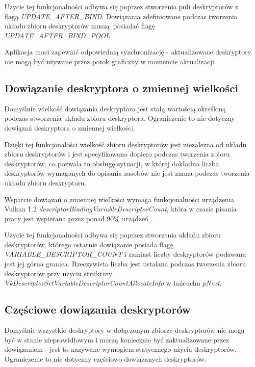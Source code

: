 Użycie tej funkcjonalności odbywa się poprzez stworzenia puli deskryptorów z flagą \textit{UPDATE\_AFTER\_BIND}. Dowiązania zdefiniowane podczas tworzenia układu zbioru deskryptorów muszą posiadać flagę
\textit{UPDATE\_AFTER\_BIND\_POOL}.

Aplikacja musi zapewnić odpowiednią synchronizację - aktualizowane deskryptory nie mogą być używane przez potok graficzny w momencie aktualizacji.

\subsection {Dowiązanie deskryptora o zmiennej wielkości}

Domyślnie wielkość dowiązania deskryptora jest stałą wartością określoną podczas stworzenia układu zbioru deskryptora.
Ograniczenie to nie dotyczny dowiązań deskryptora o zmiennej wielkości.

Dzięki tej funkcjonalości wielkość zbioru deskryptorów jest niezależna od układu zbioru deskryptorów i jest specyfikowana dopiero podczas tworzenia zbioru deskryptorów, co pozwala to obsługę sytuacji, w której dokładna liczba deskryptorów wymaganych do opisania zasobów nie jest znana podczas tworzenia układu zbioru deskryptoru.

Wsparcie dowiązań o zmiennej wielkości wymaga funkcjonalności urządzenia Vulkan 1.2 \textit{descriptorBindingVariableDescriptorCount}, która w czasie pisania pracy jest wspierana przez ponad $90\%$ urządzeń \cite{GPUINFO}.

Użycie tej funkcjonalności odbywa się poprzez stworzenia układu zbioru deskryptorów, którego ostatnie dowiązanie posiada flagę \textit{VARIABLE\_DESCRIPTOR\_COUNT} i zamiast liczby deskryptorów podawana jest jej górna granica.
Rzeczywista liczba jest ustalana podczas tworzenia zbioru deskryptorów przy użyciu struktury \textit{VkDescriptorSetVariableDescriptorCountAllocateInfo} w łańcuchu \textit{pNext}.

\subsection {Częściowe dowiązania deskryptorów}

Domyślnie wszystkie deskryptory w dołączonym zbiorze deskryptorów nie mogą być w stanie nieprawidłowym i muszą koniecznie być zaktualizowane przez dowiązaniem - jest to nazywane wymogiem statycznego użycia deskryptorów.
Ograniczenie to nie dotyczny częściowo dowiązanych deskryptorów.


